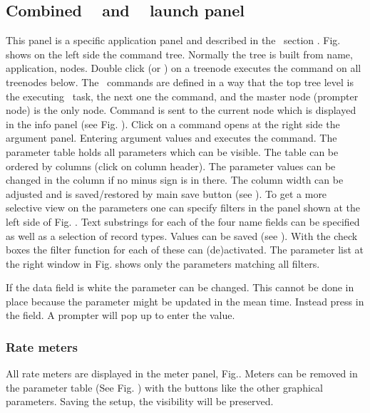 {\subsection{Combined \dabc~ and \mbs~ launch panel}
This panel is a specific application panel and described in the \mbs\ section .
Fig.  shows
on the left side the command tree. Normally the tree is built
from name, application, nodes. Double click (or ) on a treenode
executes the command on all treenodes below. The \mbs\ commands
are defined in a way that the top tree level is the executing \mbs\ task,
the next one the command, and the master node (prompter node) is the only node.
Command is sent to the current node which is displayed in the info panel
(see Fig. ).
Click on a command opens at the right side the argument panel.
Entering argument values and  executes the command.
The parameter table holds all parameters which can be visible.
The table can be ordered by columns (click on column header). 
The parameter values can be changed
in the  column if no minus sign is in there.
The column width can be adjusted and is saved/restored by main save button
(see ).
To get a more selective view on the parameters one can specify
filters in the panel shown at the left side of Fig. . 
Text substrings for each of the four name fields
can be specified as well as a selection of record types.
Values can be saved (see ).
With the check boxes the filter function for each of these can (de)activated.
The parameter list at the right window in Fig. 
shows only the parameters matching all filters.

If the data field is white the parameter can be changed.
This cannot be done in place because the parameter might be
updated in the mean time. Instead press  in the field.
A prompter will pop up to enter the value.
\subsubsection{Rate meters}
All rate meters are displayed in the meter panel, Fig.. 
Meters can be removed
in the parameter table (See Fig. ) 
with the  buttons like the other graphical parameters.
Saving the setup, the visibility will be preserved.

}
